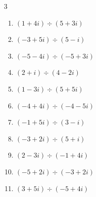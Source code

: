 \begin{multicols}{3}
\begin{enumerate}

  \item $\displaystyle (1+4i)\div(5+3i)$


  \item $\displaystyle (-3+5i)\div(5-i)$


  \item $\displaystyle (-5-4i)\div(-5+3i)$


  \item $\displaystyle (2+i)\div(4-2i)$


  \item $\displaystyle (1-3i)\div(5+5i)$


  \item $\displaystyle (-4+4i)\div(-4-5i)$


  \item $\displaystyle (-1+5i)\div(3-i)$


  \item $\displaystyle (-3+2i)\div(5+i)$


  \item $\displaystyle (2-3i)\div(-1+4i)$


\columnbreak %

\resetques

  \item $\displaystyle (-5+2i)\div(-3+2i)$


  \item $\displaystyle (3+5i)\div(-5+4i)$


\end{enumerate}
\end{multicols}
